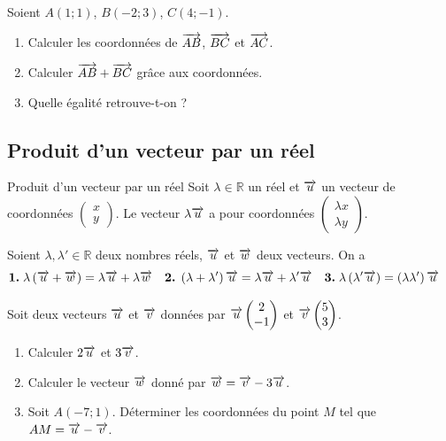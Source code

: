 \documentclass[11pt]{article}
\begin{document}
\begin{app}
  Soient $A(1; 1)$, $B(-2; 3)$, $C(4; -1)$.
  \begin{enumerate}
    \item Calculer les coordonnées de $\overrightarrow{AB}$, $\overrightarrow{BC}$ et
      $\overrightarrow{AC}$.
    \item Calculer $\overrightarrow{AB}+\overrightarrow{BC}$ gr\^ace aux coordonnées.
    \item Quelle égalité retrouve-t-on ?
  \end{enumerate}
\end{app}

\subsection{Produit d'un vecteur par un réel}
\begin{defi}{Produit d'un vecteur par un réel}
  Soit $\lambda\in\mathbb{R}$ un réel et $\overrightarrow{u}$ un vecteur de coordonnées
  $\begin{pmatrix}x\\y\end{pmatrix}$. Le vecteur $\lambda\overrightarrow{u}$ a pour
  coordonnées $\begin{pmatrix}\lambda x \\ \lambda y \end{pmatrix}$.
\end{defi}
\begin{prop}
  Soient $\lambda, \lambda'\in\mathbb{R}$ deux nombres réels, $\overrightarrow{u}$ et $\overrightarrow{w}$ deux vecteurs. On a
  \begin{align*}
    \textbf{1.}\;& \lambda\left( \overrightarrow{u} +\overrightarrow{w} \right) = \lambda\overrightarrow{u}+\lambda\overrightarrow{w} &
    \textbf{2.}\;& \left( \lambda+\lambda' \right)\overrightarrow{u} = \lambda\overrightarrow{u}+\lambda'\overrightarrow{u} &
    \textbf{3.}\;& \lambda\left( \lambda'\overrightarrow{u}\right) = \left( \lambda\lambda'
    \right)\overrightarrow{u}
  \end{align*}
\end{prop}

\begin{app}
  Soit deux vecteurs $\overrightarrow{u} $ et $\overrightarrow{v}$ données par $\overrightarrow{u}\begin{pmatrix}
    2\\-1\end{pmatrix}$ et $\overrightarrow{v}\begin{pmatrix}5\\3\end{pmatrix}$.
  \begin{enumerate}
    \item Calculer $2\overrightarrow{u}$ et $3\overrightarrow{v}$.
    \item Calculer le vecteur $\overrightarrow{w}$ donné par $\overrightarrow{w}=\overrightarrow{v}-3\overrightarrow{u}$.
    \item Soit $A(-7; 1)$. Déterminer les coordonnées du point $M$ tel que $AM =
      \overrightarrow{u}-\overrightarrow{v}$.
  \end{enumerate}
\end{app}
\end{document}
